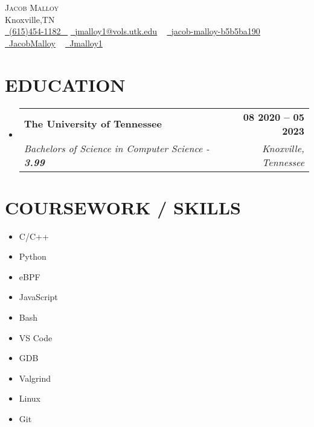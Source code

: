 \documentclass[letterpaper,12pt]{article}
\makeatletter
\newcommand{\resumeSubheading}[4]{
    \vspace{-2pt}\item
        \begin{tabular*}{1.0\textwidth}[t]{l@{\extracolsep{\fill}}r}
            \textbf{\large#1} & \textbf{\small #2} \\
            \textit{\large#3} & \textit{\small #4} \\

        \end{tabular*}\vspace{-7pt}
}
\newcommand{\resumeSubHeadingListStart}{\begin{itemize}[leftmargin=0.0in, label={}]}
\newcommand{\resumeSubHeadingListEnd}{\end{itemize}}
\makeatother
\begin{document}

\begin{center}
        {\Huge \scshape Jacob Malloy} \\ \vspace{1pt}
        Knoxville,TN \\ \vspace{1pt}
        \small \href{tel:+16154541182}{ \raisebox{-0.1\height}\faPhone\ \underline{(615)454-1182} ~} \href{mailto:jmalloy1@vols.utk.edu}{\raisebox{-0.2\height}\faEnvelope\  \underline{jmalloy1@vols.utk.edu}} ~
        \href{https://www.linkedin.com/in/jacob-malloy-b5b5ba190/}{\raisebox{-0.2\height}\faLinkedin\ \underline{jacob-malloy-b5b5ba190}}  ~
        \href{https://github.com/jacobmalloy}{\raisebox{-0.2\height}\faGithub\ \underline{JacobMalloy}} ~
        \href{https://gitlab.com/jmalloy1}{\raisebox{-0.2\height}\faGitlab\ \underline{Jmalloy1}} ~
        \vspace{-8pt}
\end{center}


\section{EDUCATION}
    \resumeSubHeadingListStart
        \resumeSubheading
            {The University of Tennessee}{08 2020 -- 05 2023}
            {Bachelors of Science in Computer Science - \textbf{3.99}}{Knoxville, Tennessee}
    \resumeSubHeadingListEnd

\section{COURSEWORK / SKILLS}
                \begin{multicols}{5}
                        \begin{itemize}[itemsep=-2pt, parsep=4pt]
                                \item C/C++
                                \item Python
                                \item eBPF
                                \item JavaScript
                                \item Bash
                                \item VS Code
                                \item GDB
                                \item Valgrind
                                \item Linux
                                \item Git
                        \end{itemize}
                \end{multicols}
                \vspace*{2.0\multicolsep}
\end{document}
